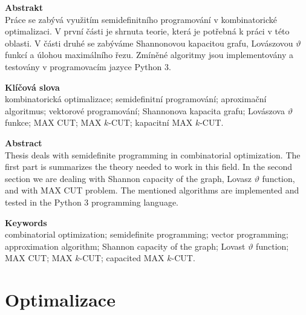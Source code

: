 \documentclass[a4paper,oneside,12pt]{book}
\theoremstyle{definition}
\theoremstyle{plain}
\theoremstyle{remark}
\begin{document}
\newpage
\thispagestyle{empty}
{\Large
\noindent\textbf{Abstrakt}}\\[3pt]
Práce se zabývá využitím semidefinitního programování v kombinatorické optimalizaci. V první části je shrnuta teorie, která je potřebná k práci v této oblasti. V části druhé se zabýváme Shannonovou kapacitou grafu, Lovászovou $\vartheta$ funkcí a úlohou maximálního řezu. Zmíněné algoritmy jsou implementovány a testovány v programovacím jazyce Python 3.


\vfill
{\Large
\noindent\textbf{Klíčová slova}}\\[3pt]
kombinatorická optimalizace; semidefinitní programování; aproximační algoritmus; vektorové programování; Shannonova kapacita grafu; Lovászova $\vartheta$ funkce; MAX CUT; MAX $k$-CUT; kapacitní MAX $k$-CUT.


\newpage
\thispagestyle{empty}
{\Large
\noindent\textbf{Abstract}}\\[3pt]
Thesis deals with semidefinite programming in combinatorial optimization. The first part is summarizes the theory needed to work in this field. In the second section we are dealing with Shannon capacity of the graph, Lovasz $\vartheta$ function, and with MAX CUT problem. The mentioned algorithms are implemented and tested in the Python 3 programming language.


\vfill
{\Large
\noindent\textbf{Keywords}}\\[3pt]
combinatorial optimization; semidefinite programming; vector programming; approximation algorithm; Shannon capacity of the graph; Lovast $\vartheta$ function; MAX CUT; MAX $k$-CUT; capacited MAX $k$-CUT.


\setcounter{page}{0}
\tableofcontents

{
  \pagestyle{plain}
  
  \clearpage
  
  \clearpage
}


\part{Optimalizace}


\clearpage
\end{document}
